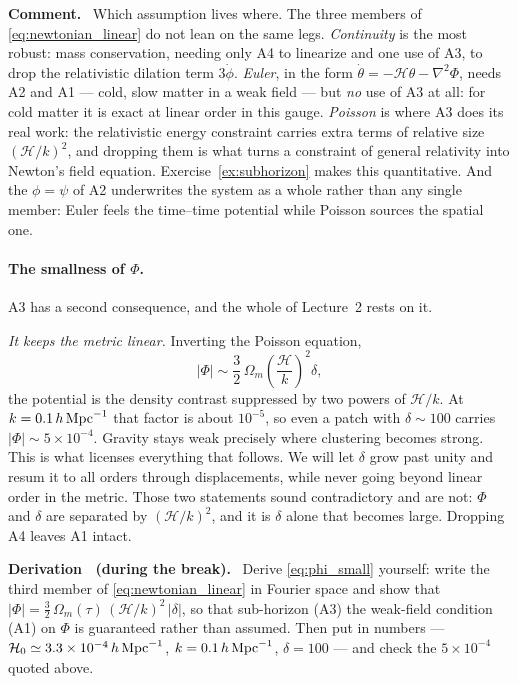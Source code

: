 \documentclass[a4paper,11pt]{article}
\def\cH{\mathcal{H}}
\def\Om{\Omega_m}
\numberwithin{equation}{section}
\newenvironment{remark}
  {\par\medskip\noindent\begingroup\small\color{ForestGreen!60!black}\textbf{Comment.}\ }
  {\endgroup\par\medskip}
\newcounter{derivation}
\newenvironment{derivation}
  {\par\medskip\noindent\begingroup\small\refstepcounter{derivation}%
   \color{Plum!60!black}\textbf{Derivation \thederivation\ (during the break).}\ }
  {\endgroup\par\medskip}
\begin{document}
\begin{remark}
Which assumption lives where. The three members of \eqref{eq:newtonian_linear}
do not lean on the same legs. \emph{Continuity} is the most robust: mass
conservation, needing only A4 to linearize and one use of A3, to drop the
relativistic dilation term $3\dot\phi$. \emph{Euler}, in the form
$\dot\theta = -\cH\theta - \nabla^2\Phi$, needs A2 and A1 --- cold, slow matter
in a weak field --- but \emph{no} use of A3 at all: for cold matter it is exact
at linear order in this gauge. \emph{Poisson} is where A3 does its real work:
the relativistic energy constraint carries extra terms of relative size
$(\cH/k)^2$, and dropping them is what turns a constraint of general relativity into Newton's field equation. Exercise~\ref{ex:subhorizon} makes this
quantitative. And the $\phi = \psi$ of A2 underwrites the system as a whole
rather than any single member: Euler feels the time--time potential while
Poisson sources the spatial one.
\end{remark}

\paragraph{The smallness of $\Phi$.} A3 has a second consequence, and the
whole of Lecture~2 rests on it.

\emph{It keeps the metric linear.} Inverting the Poisson equation,
\begin{equation}
|\Phi| \sim \frac{3}{2}\,\Om\left(\frac{\cH}{k}\right)^{\!2}\delta ,
\label{eq:phi_small}
\end{equation}
the potential is the density contrast suppressed by two powers of $\cH/k$. At
$k = 0.1\,h\,{\rm Mpc}^{-1}$ that factor is about $10^{-5}$, so even a patch with
$\delta \sim 100$ carries $|\Phi| \sim 5\times10^{-4}$. Gravity stays weak precisely where clustering becomes strong. This is what licenses everything that follows. We will let $\delta$ grow past unity and resum it to all orders
through displacements, while never going beyond linear order in the metric. Those
two statements sound contradictory and are not: $\Phi$ and $\delta$ are separated
by $(\cH/k)^2$, and it is $\delta$ alone that becomes large. Dropping A4
leaves A1 intact.

\begin{derivation}
Derive \eqref{eq:phi_small} yourself: write the third member of
\eqref{eq:newtonian_linear} in Fourier space and show that
$|\Phi| = \tfrac32\,\Om(\tau)\,(\cH/k)^2\,|\delta|$, so that sub-horizon (A3)
the weak-field condition (A1) on $\Phi$ is guaranteed rather than assumed.
Then put in numbers --- $\cH_0 \simeq 3.3\times10^{-4}\,h\,{\rm Mpc}^{-1}$,
$k = 0.1\,h\,{\rm Mpc}^{-1}$, $\delta = 100$ --- and check the $5\times10^{-4}$
quoted above.
\end{derivation}
\end{document}
